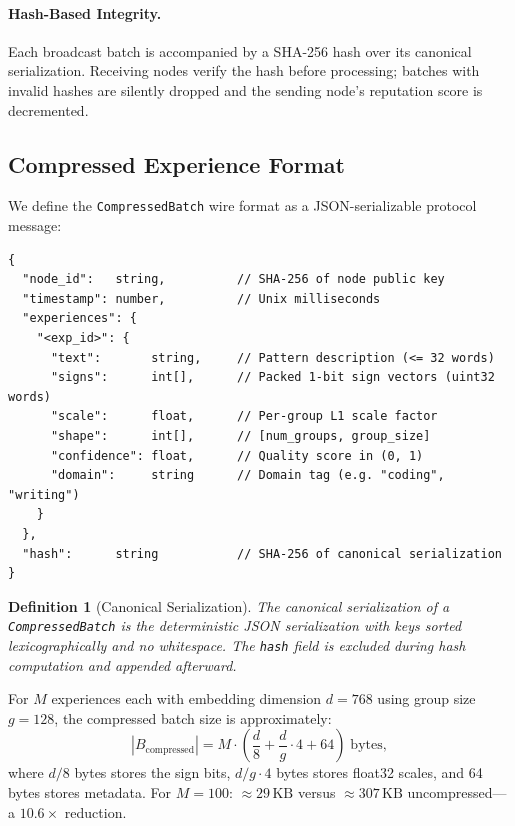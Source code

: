 \documentclass[11pt]{article}
\newtheorem{definition}{Definition}
\begin{document}
\paragraph{Hash-Based Integrity.}
Each broadcast batch is accompanied by a SHA-256 hash over its canonical
serialization. Receiving nodes verify the hash before processing; batches
with invalid hashes are silently dropped and the sending node's reputation
score is decremented.

\subsection{Compressed Experience Format}

We define the \texttt{CompressedBatch} wire format as a JSON-serializable
protocol message:

\begin{verbatim}
{
  "node_id":   string,          // SHA-256 of node public key
  "timestamp": number,          // Unix milliseconds
  "experiences": {
    "<exp_id>": {
      "text":       string,     // Pattern description (<= 32 words)
      "signs":      int[],      // Packed 1-bit sign vectors (uint32 words)
      "scale":      float,      // Per-group L1 scale factor
      "shape":      int[],      // [num_groups, group_size]
      "confidence": float,      // Quality score in (0, 1)
      "domain":     string      // Domain tag (e.g. "coding", "writing")
    }
  },
  "hash":      string           // SHA-256 of canonical serialization
}
\end{verbatim}

\begin{definition}[Canonical Serialization]
The canonical serialization of a \texttt{CompressedBatch} is the
deterministic JSON serialization with keys sorted lexicographically and
no whitespace. The \texttt{hash} field is excluded during hash computation
and appended afterward.
\end{definition}

For $M$ experiences each with embedding dimension $d = 768$ using group size
$g = 128$, the compressed batch size is approximately:
\begin{equation}
    |B_{\text{compressed}}| = M \cdot \left(\frac{d}{8} + \frac{d}{g} \cdot 4 + 64\right) \; \text{bytes},
\end{equation}
where $d/8$ bytes stores the sign bits, $d/g \cdot 4$ bytes stores float32
scales, and 64 bytes stores metadata. For $M = 100$: ${\approx}29\,\text{KB}$
versus ${\approx}307\,\text{KB}$ uncompressed---a $10.6\times$ reduction.
\end{document}
